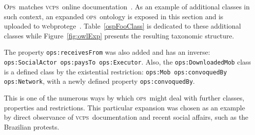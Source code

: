 \documentclass[10pt,letterpaper]{article}
\newcommand{\ops}{\textsc{ops}}
\newcommand{\opsi}{O\textsc{ps}}
\newcommand{\vcps}{\textsc{vcps}}
\newcommand{\webprotege}{\textsc{w}ebprotege}
\begin{document}

\opsi\ matches \vcps\ online documentation~\cite{corais}. As an example of additional classes in such context, an expanded \ops\ ontology is exposed in this section and is uploaded to \webprotege~\cite{owlExp}. Table~\ref{ospFooClass} is dedicated to these additional classes while Figure~\ref{fig:owlExp} presents the resulting taxonomic structure.

The property {\tt ops:receivesFrom} was also added and has an inverse: \texttt{ops:SocialActor ops:paysTo ops:Executor}. Also, the {\tt ops:DownloadedMob} class is a defined class by the existential restriction: \texttt{ops:Mob ops:convoquedBy ops:Network}, with a newly defined property \texttt{ops:convoquedBy}.

This is one of the numerous ways by which \ops\ might deal with further classes, properties and restrictions. This particular expansion was chosen as an example by direct observance of \vcps\ documentation and recent social affairs, such as the Brazilian protests.
\end{document}
